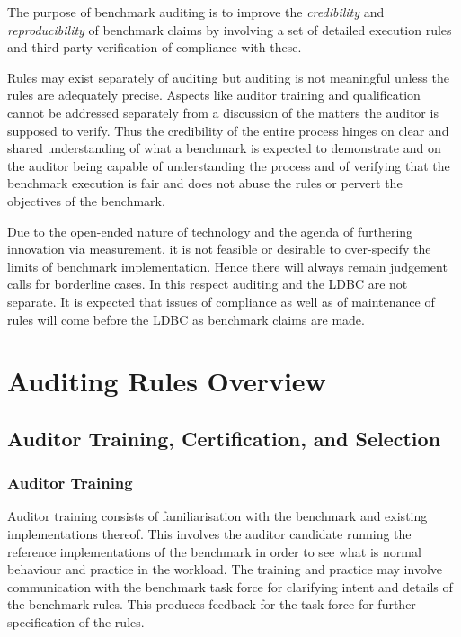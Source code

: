 The purpose of benchmark auditing is to improve the \emph{credibility} and \emph{reproducibility} of benchmark claims by involving a set of detailed execution rules and third party verification of compliance with these.

Rules may exist separately of auditing but auditing is not meaningful unless the rules are adequately precise.
Aspects like auditor training and qualification cannot be addressed separately from a discussion of the matters the
auditor is supposed to verify. Thus the credibility of the entire process hinges on clear and shared understanding
of what a benchmark is expected to demonstrate and on the auditor being capable of understanding the process
and of verifying that the benchmark execution is fair and does not abuse the rules or pervert the objectives of
the benchmark.

Due to the open-ended nature of technology and the agenda of furthering innovation via measurement, it is
not feasible or desirable to over-specify the limits of benchmark implementation. Hence there will always remain
judgement calls for borderline cases. In this respect auditing and the LDBC are not separate. It is expected that
issues of compliance as well as of maintenance of rules will come before the LDBC as benchmark claims are
made.


\section{Auditing Rules Overview}


\subsection{Auditor Training, Certification, and Selection}
\subsubsection{Auditor Training}
Auditor training consists of familiarisation with the benchmark and existing implementations thereof. This involves the auditor candidate running the reference implementations of the benchmark in order to see what is normal behaviour and practice in the workload. The training and practice may involve communication with the benchmark task force for clarifying intent and details of the benchmark rules. This produces feedback for the task force for further specification of the rules.


